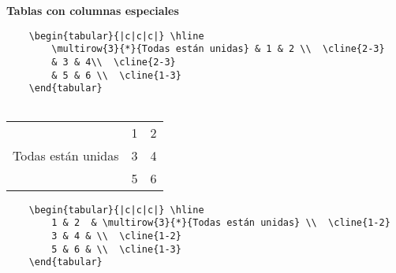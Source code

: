 \documentclass[12pt]{book}
\numberwithin{equation}{section}
\theoremstyle{plain}  %
\begin{document}
\makeatletter	
\def\@roman#1{\romannumeral#1}
\makeatother
\renewcommand{\baselinestretch}{1.5}%
\renewcommand{\thefootnote}{\arabic{footnote}} %
\renewcommand{\refname}{Referencias bibliográficas}
\newcommand{\tto}{\longrightarrow}
\newcommand{\N}{\ensuremath{\mathbb{N}}}
\newcommand{\parcial}[2]{\frac{\partial#1}{\partial#2}}
\newcommand{\Norma}[1]{\Vert#1\Vert}
\newcommand{\upla}[2]{(#1_1,#1_2,$\ldots$,#1_{#2})}
	\newcommand{\uplamatrix}[3]{
	\begin{pmatrix}  
		#1_{11} &  #1_{12}  & \cdots  &  #1_{1 #3} \\   
		#1_{21} &  #1_{22} &  \cdots  & #1_{2 #3}  \\ 
		\vdots     &  \vdots      & \vdots  & \vdots \\
	#1_{#2 1} & #1_{#2 2} &  \cdots &  #1_{#2 #3}
\end{pmatrix}}
	\newcommand{\kupla}[3][k]{
	(#2_{#3},$\ldots$ #2_{#1})	
}
\textbf{Tablas con columnas especiales}\\

\begin{verbatim}
	\begin{tabular}{|c|c|c|} \hline
		\multirow{3}{*}{Todas están unidas} & 1 & 2 \\  \cline{2-3}
		& 3 & 4\\  \cline{2-3}
		& 5 & 6 \\  \cline{1-3}
	\end{tabular}
	
\end{verbatim}


\begin{tabular}{|c|c|c|} \hline
\multirow{3}{*}{Todas están unidas} & 1 & 2 \\  \cline{2-3}
& 3 & 4\\  \cline{2-3}
& 5 & 6 \\  \cline{1-3}
\end{tabular}


\begin{verbatim}
	\begin{tabular}{|c|c|c|} \hline
		1 & 2  & \multirow{3}{*}{Todas están unidas} \\  \cline{1-2}
		3 & 4 & \\  \cline{1-2}
		5 & 6 & \\  \cline{1-3}
	\end{tabular}
\end{verbatim}
\end{document}
